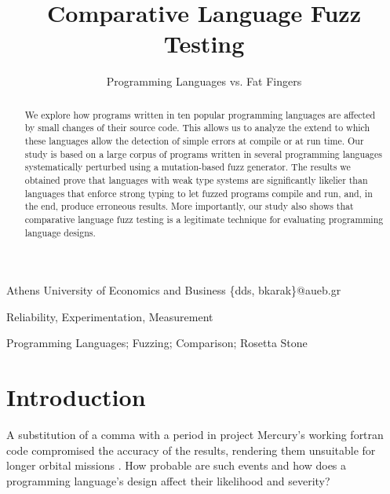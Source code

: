 \documentclass[10pt]{sigplanconf}
\begin{document}
\copyrightdata{[to be supplied]}


\title{Comparative Language Fuzz Testing}
\subtitle{Programming Languages vs. Fat Fingers}

  {Athens University of Economics and Business}
  {\{dds, bkarak\}@aueb.gr}

\maketitle

\begin{abstract}
We explore how programs written in ten popular programming languages
are affected by small changes of their source code.
This allows us to analyze the extend to which these languages
allow the detection of simple errors at compile or at run time.
Our study is based on a large corpus of programs written in several programming
languages systematically perturbed using a mutation-based fuzz generator.
The results we obtained
prove that languages with weak type systems are significantly
likelier than languages that enforce strong typing to let fuzzed programs
compile and run, and, in the end, produce erroneous results.
More importantly, our study also shows that comparative language fuzz testing
is a legitimate technique for evaluating programming language designs.
\end{abstract}


\terms
Reliability, Experimentation, Measurement

\keywords
Programming Languages; Fuzzing; Comparison; Rosetta Stone

\section{Introduction} %
\label{sec:intro}
A substitution of a comma with a period in project Mercury's working
{\sc fortran} code compromised the accuracy of the results,
rendering them unsuitable for longer orbital missions \cite{Brad89,Neu95}.
How probable are such events and how does a programming language's
design affect their likelihood and severity?
\end{document}
